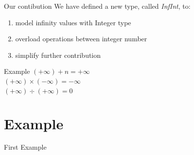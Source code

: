 \documentclass{beamer}
\begin{document}
	\begin{frame}{Our contibution}
		We have defined a new type, called \large\textit{InfInt}\normalsize, to:\\
		\begin{enumerate}
			\item model infinity values with Integer type
			\item overload operations between integer number
			\item simplify further contribution
		\end{enumerate}

	\begin{block}{Example}
		$(+\infty) + n = +\infty$\\
		$(+\infty) \times (-\infty) = -\infty$  \\
		$(+\infty) \div (+\infty) = 0$
	\end{block}
	\end{frame}

	\section{Example}
	\begin{frame}{First Example}
		
	\end{frame}
\end{document}
